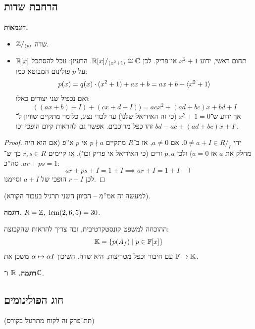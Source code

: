 \documentclass[name=רשימות אלגברה לינארית 2א]{../../../tex/classes/megasumPreamble}
\begin{document}
	\subsection{הרחבת שדות}
	
	\textbf{דוגמאות. }
	\begin{itemize}
		\item $\mathbb{Z}/_{\langle p \rangle}$ שדה. 
		\item $\mathbb{R}[x]$ תחום ראשי, ידוע $x^2 + 1$ אי־פריק. לכן $\mathbb{R}[x]/_{\langle x^2 + 1\rangle}\cong \mathbb{C}$. הרעיון: נוכל להסתכל על $p$ פולינום המבוטא כמו: 
		\[ p(x) = q(x) \cdot (x^2 + 1) + ax + b = ax +b + \langle x^2 + 1\rangle \]
		ואם נכפיל שני יצורים כאלו: 
		\[ ((ax + b) + I) + (cx + d + I)) = acx^2 + (ad + bc)x + bd + I \]
		אך ידוע ש־$x^2 + 1 = 0$ (כי זה האידיאל שלנו) עד לכדי נציג, כלומר מתקיים שוויון ל־$bd - ac + (ad + bc)x + I$ זהו כפל מרוכבים. אפשר גם להראות קיום הופכי וכו'. 
	\end{itemize}
	\begin{proof}
		יהי $0 \neq a + I \in R/_I$. אם $a \neq 0$, אז ב־$R$ מתקיים $p \nmid a$ אי $p$ א''פ (אם הוא היה מחלק את $a$ אז $a = 0$) ולכן $p, a$ זרים (כי האידיאל אי פריק וכו'). אז קיימים $r, s \in R$ כך ש־$ar + ps = 1$. סה''כ: 
		\[ ar + ps + I = 1 + I \implies ar + I = 1 + I \quad \top \]
		לכן $r + I$ הופכי של $a + I$ וסיימנו. 
	\end{proof}
	(למעשה זה אמ''מ – הכיוון השני תרגיל בעבור הקורא). 
	
	\textbf{דוגמה. }$R = \mathbb{Z}, \ \operatorname{lcm}(2, 6, 5) = 30$. 
	
	ההוכחה למשפט קונסטקרטיבית, ובה צריך להראות שהקבוצה: 
	\[ \mathbb{K} = \{p(A_f) \mid p \in \mathbb{F}[x]\} \]
	עם חיבור וכפל מטריצות, היא שדה. השיכון $\alpha \mapsto \alpha I$ משכן את $\mathbb{F} \mapsto \mathbb{K}$. 
	
	
	\textbf{דוגמה. }$\mathbb{R}$ ו־$\mathbb{C}$. 
	
	\subsection{חוג הפולינומים}
	(תת־פרק זה לקוח מתרגול בקורס)
	\theo{
	\[ \deg(f\cdot g) = \deg f + \deg g \quad \deg(d + g) = \max\{\deg f, \deg g\} \]}
	
\end{document}
